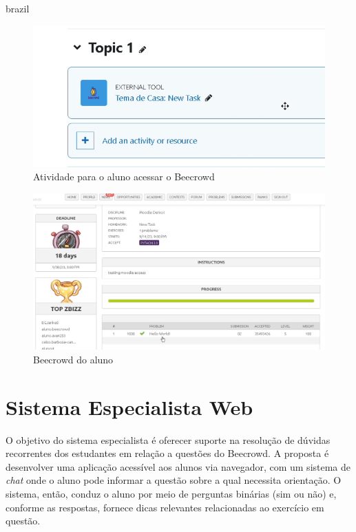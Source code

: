 \begin{otherlanguage*}{brazil}
\begin{figure}[H]
    \centering
            \caption{Atividade para o aluno acessar o Beecrowd}
            \label{fig:ModeloConceitual}
        \includegraphics[scale=0.4]{pictures/desenvolvimento/lti_tarefa.png}
\end{figure}

\begin{figure}[H]
    \centering
            \caption{Beecrowd do aluno}
            \label{fig:ModeloConceitual}
        \includegraphics[scale=0.4]{pictures/desenvolvimento/lti_beecrowd_aluno.png}
\end{figure}

\section{Sistema Especialista Web}

O objetivo do sistema especialista é oferecer suporte na resolução de dúvidas recorrentes dos estudantes em relação a questões do Beecrowd. A proposta é desenvolver uma aplicação acessível aos alunos via navegador, com um sistema de \textit{chat} onde o aluno pode informar a questão sobre a qual necessita orientação. O sistema, então, conduz o aluno por meio de perguntas binárias (sim ou não) e, conforme as respostas, fornece dicas relevantes relacionadas ao exercício em questão.


\end{otherlanguage*}
